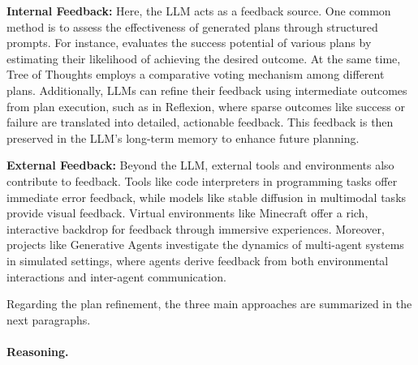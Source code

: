 \textbf{Internal Feedback:} Here, the LLM acts as a feedback source.
One common method is to assess the effectiveness of generated plans through structured prompts.
For instance, \textcite{hao2023reasoning} evaluates the success potential of various plans by estimating their likelihood of achieving the desired outcome. At the same time, Tree of Thoughts employs a comparative voting mechanism among different plans.
Additionally, LLMs can refine their feedback using intermediate outcomes from plan execution, such as in Reflexion, where sparse outcomes like success or failure are translated into detailed, actionable feedback.
This feedback is then preserved in the LLM’s long-term memory to enhance future planning.

\textbf{External Feedback:} Beyond the LLM, external tools and environments also contribute to feedback.
Tools like code interpreters in programming tasks offer immediate error feedback, while models like stable diffusion in multimodal tasks provide visual feedback.
Virtual environments like Minecraft offer a rich, interactive backdrop for feedback through immersive experiences.
Moreover, projects like Generative Agents investigate the dynamics of multi-agent systems in simulated settings, where agents derive feedback from both environmental interactions and inter-agent communication.

Regarding the plan refinement, the three main approaches are summarized in the next paragraphs.

\paragraph{Reasoning.}
\label{par:reasoning}

